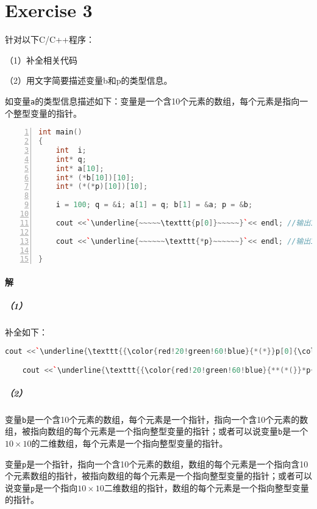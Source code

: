 \documentclass{article}
\begin{document}
\section{Exercise 3}
针对以下C/C++程序：\par
（1）补全相关代码\par
（2）用文字简要描述变量b和p的类型信息。\par
如变量\texttt{a}的类型信息描述如下：变量是一个含10个元素的数组，每个元素是指向一个整型变量的指针。
\begin{lstlisting}[language = C++, 
         numbers=left, 
         numberstyle=\tiny,
         keywordstyle=\bfseries\color{blue!70},
         commentstyle=\color{red!40!green!60!blue},
         frame=shadowbox,
         rulesepcolor=\color{red!20!green!30!blue!20},
         basicstyle=\ttfamily,
         escapeinside=``]
int main()
{
    int  i;
    int* q;
    int* a[10];
    int* (*b[10])[10];
    int* (*(*p)[10])[10];
      
    i = 100; q = &i; a[1] = q; b[1] = &a; p = &b;

    cout <<`\underline{~~~~~\texttt{p[0]}~~~~~}`<< endl; //输出100，待补全

    cout <<`\underline{~~~~~~\texttt{*p}~~~~~~}`<< endl; //输出100，待补全

}
\end{lstlisting}

\paragraph{解}
\subparagraph{（1）}
补全如下：
\begin{lstlisting}[language = C++, 
         keywordstyle=\bfseries\color{blue!70},
         commentstyle=\color{red!40!green!60!blue},
         frame=shadowbox,
         rulesepcolor=\color{red!20!green!30!blue!20},
         basicstyle=\ttfamily,
         escapeinside=``]
    cout <<`\underline{\texttt{{\color{red!20!green!60!blue}{*(*}}p[0]{\color{red!20!green!60!blue}{[1])[1]}}}}`<< endl; //输出100

    cout <<`\underline{\texttt{{\color{red!20!green!60!blue}{**(*(}}*p{\color{red!20!green!60!blue}{+1)+1)}}}}`<< endl; //输出100
\end{lstlisting}
\subparagraph{（2）}
变量\texttt{b}是一个含10个元素的数组，每个元素是一个指针，指向一个含10个元素的数组，被指向数组的每个元素是一个指向整型变量的指针；或者可以说变量\texttt{b}是一个$10\times10$的二维数组，每个元素是一个指向整型变量的指针。\par
变量\texttt{p}是一个指针，指向一个含10个元素的数组，数组的每个元素是一个指向含10个元素数组的指针，被指向数组的每个元素是一个指向整型变量的指针；或者可以说变量\texttt{p}是一个指向$10\times10$二维数组的指针，数组的每个元素是一个指向整型变量的指针。
\end{document}
